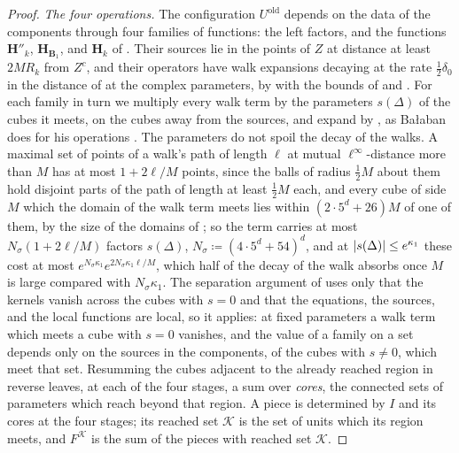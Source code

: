 \documentclass[11pt]{preprint}
\DeclarePairedDelimiter{\abs}{\lvert}{\rvert}
\numberwithin{equation}{section}
\theoremstyle{definition}
\theoremstyle{remark}
\theoremstyle{plain}
\begin{document}
\begin{proof}
\emph{The four operations.} The configuration $U^{\mathrm{old}}$ depends on the data of the components through four families of functions: the left factors, and the functions $\mathbf H''_k$, $\mathbf H_{\mathbf B_1}$, and $\mathbf H_k$ of \cite[(1.61)--(1.63)]{BalabanLFR2}. Their sources lie in the points of $Z$ at distance at least $2MR_k$ from $Z^c$, and their operators have walk expansions decaying at the rate $\frac12\delta_0$ in the distance of \cite[(2.46)]{BalabanPRT2} at the complex parameters, by \cite[(190)]{BalabanVAR} with the bounds of \cite[(1.11), p.~5]{BalabanRG2} and \cite[Theorem~3.13]{BalabanPBG}. For each family in turn we multiply every walk term by the parameters $s(\Delta)$ of the cubes it meets, on the cubes away from the sources, and expand by \cite[(1.9)]{BalabanRG2}, as Ba{\l}aban does for his operations \cite[p.~373, ll.~31--35; p.~374, ll.~8--11, ll.~26--29]{BalabanLFR2}. The parameters do not spoil the decay of the walks. A maximal set of points of a walk's path of length $\ell$ at mutual $\ell^\infty$-distance more than $M$ has at most $1 + 2\ell/M$ points, since the balls of radius $\frac12M$ about them hold disjoint parts of the path of length at least $\frac12M$ each, and every cube of side $M$ which the domain of the walk term meets lies within $(2 \cdot 5^d + 26)M$ of one of them, by the size of the domains of \cite[p.~408, ll.~20--24]{BalabanPBG}; so the term carries at most $N_\sigma(1 + 2\ell/M)$ factors $s(\Delta)$, $N_\sigma \coloneqq (4 \cdot 5^d + 54)^d$, and at $\abs{s(\Delta)} \leq e^{\kappa_1}$ these cost at most $e^{N_\sigma\kappa_1}e^{2N_\sigma\kappa_1\ell/M}$, which half of the decay of the walk absorbs once $M$ is large compared with $N_\sigma\kappa_1$. The separation argument of \cite[p.~4, ll.~17--30]{BalabanRG2} uses only that the kernels vanish across the cubes with $s = 0$ and that the equations, the sources, and the local functions are local, so it applies: at fixed parameters a walk term which meets a cube with $s = 0$ vanishes, and the value of a family on a set depends only on the sources in the components, of the cubes with $s \neq 0$, which meet that set. Resumming the cubes adjacent to the already reached region in reverse leaves, at each of the four stages, a sum over \emph{cores}, the connected sets of parameters which reach beyond that region. A piece is determined by $I$ and its cores at the four stages; its reached set $\mathcal K$ is the set of units which its region meets, and $F^{\mathcal K}$ is the sum of the pieces with reached set $\mathcal K$.


\end{proof}
\end{document}
